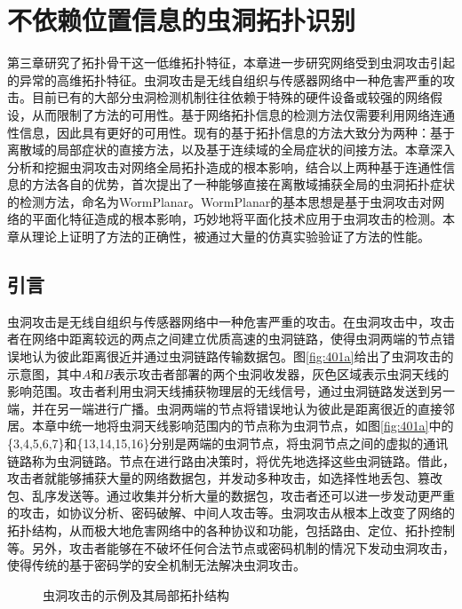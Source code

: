 \chapter{不依赖位置信息的虫洞拓扑识别}
\label{chap:4}
第三章研究了拓扑骨干这一低维拓扑特征，本章进一步研究网络受到虫洞攻击引起的异常的高维拓扑特征。虫洞攻击是无线自组织与传感器网络中一种危害严重的攻击。目前已有的大部分虫洞检测机制往往依赖于特殊的硬件设备或较强的网络假设，从而限制了方法的可用性。基于网络拓扑信息的检测方法仅需要利用网络连通性信息，因此具有更好的可用性。现有的基于拓扑信息的方法大致分为两种：基于离散域的局部症状的直接方法，以及基于连续域的全局症状的间接方法。本章深入分析和挖掘虫洞攻击对网络全局拓扑造成的根本影响，结合以上两种基于连通性信息的方法各自的优势，首次提出了一种能够直接在离散域捕获全局的虫洞拓扑症状的检测方法，命名为WormPlanar。WormPlanar的基本思想是基于虫洞攻击对网络的平面化特征造成的根本影响，巧妙地将平面化技术应用于虫洞攻击的检测。本章从理论上证明了方法的正确性，被通过大量的仿真实验验证了方法的性能。
\section{引言}
虫洞攻击是无线自组织与传感器网络中一种危害严重的攻击。在虫洞攻击中，攻击者在网络中距离较远的两点之间建立优质高速的虫洞链路，使得虫洞两端的节点错误地认为彼此距离很近并通过虫洞链路传输数据包。图\ref{fig:401a}给出了虫洞攻击的示意图，其中$A$和$B$表示攻击者部署的两个虫洞收发器，灰色区域表示虫洞天线的影响范围。攻击者利用虫洞天线捕获物理层的无线信号，通过虫洞链路发送到另一端，并在另一端进行广播。虫洞两端的节点将错误地认为彼此是距离很近的直接邻居。本章中统一地将虫洞天线影响范围内的节点称为虫洞节点，如图\ref{fig:401a}中的\{3,4,5,6,7\}和\{13,14,15,16\}分别是两端的虫洞节点，将虫洞节点之间的虚拟的通讯链路称为虫洞链路。节点在进行路由决策时，将优先地选择这些虫洞链路。借此，攻击者就能够捕获大量的网络数据包，并发动多种攻击，如选择性地丢包、篡改包、乱序发送等。通过收集并分析大量的数据包，攻击者还可以进一步发动更严重的攻击，如协议分析、密码破解、中间人攻击等。虫洞攻击从根本上改变了网络的拓扑结构，从而极大地危害网络中的各种协议和功能，包括路由、定位、拓扑控制等。另外，攻击者能够在不破坏任何合法节点或密码机制的情况下发动虫洞攻击，使得传统的基于密码学的安全机制无法解决虫洞攻击。
\begin{figure}[t]
  \centering
  \hspace{1em}
  \caption{虫洞攻击的示例及其局部拓扑结构}
  \label{fig:401}
\end{figure}

